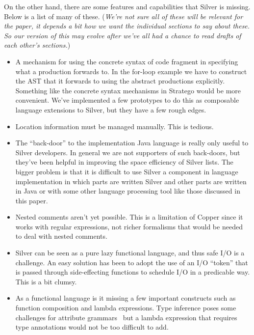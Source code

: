 On the other hand, there are some features and capabilities that
Silver is missing.   Below is a list of many of these.  (\emph{We're
  not sure all of these will be relevant for the paper, it depends a
  bit how we want the individual sections to say about these.   So our
  version of this may evolve after we've all had a chance to read
  drafts of each other's sections.})

\begin{itemize}
\item A mechanism for using the concrete syntax of code fragment in
  specifying what a production forwards to.  In the for-loop example
  we have to construct the AST that it forwards to using the abstract
  productions explicitly.   Something like the concrete syntax
  mechanisms in Stratego would be more convenient.   We've implemented a few
  prototypes to do this as composable language extensions to Silver,
  but they have a few rough edges.

\item Location information must be managed manually. This is tedious.
\item The ``back-door'' to the implementation Java language is really
  only useful to Silver developers.  In general we are not supporters
  of such back-doors, but they've been helpful in improving the space
  efficiency of Silver lists.  The bigger problem is that it is
  difficult to use Silver a component in language implementation in
  which parts are written Silver and other parts are written in Java
  or with some other language processing tool like those discussed in
  this paper.

\item Nested comments aren't yet possible.  This is a limitation of
  Copper since it works with regular expressions, not richer
  formalisms that would be needed to deal with nested comments.  

\item Silver can be seen as a pure lazy functional language, and thus
  safe I/O is a challenge.  An easy solution has been to adopt the use
  of an I/O ``token'' that is passed through side-effecting functions
  to schedule I/O in a predicable way.  This is a bit clumsy.

\item As a functional language is it missing a few important
  constructs such as function composition and lambda expressions.
  Type inference poses some challenges for attribute
  grammars~\cite{kaminski11sle} but a lambda expression that requires
  type annotations would not be too difficult to add.


\end{itemize}
